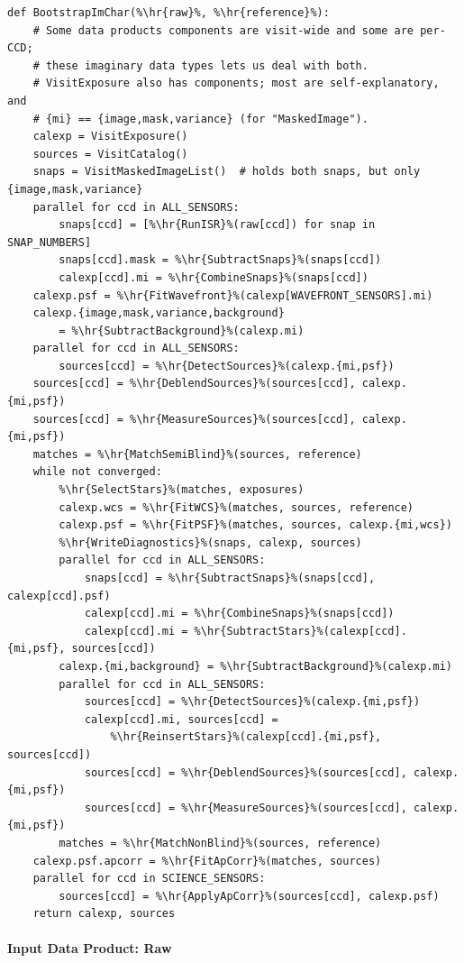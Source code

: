 \begin{lstlisting}
def BootstrapImChar(%\hr{raw}%, %\hr{reference}%):
    # Some data products components are visit-wide and some are per-CCD;
    # these imaginary data types lets us deal with both.
    # VisitExposure also has components; most are self-explanatory, and
    # {mi} == {image,mask,variance} (for "MaskedImage").
    calexp = VisitExposure()
    sources = VisitCatalog()
    snaps = VisitMaskedImageList()  # holds both snaps, but only {image,mask,variance}
    parallel for ccd in ALL_SENSORS:
        snaps[ccd] = [%\hr{RunISR}%(raw[ccd]) for snap in SNAP_NUMBERS]
        snaps[ccd].mask = %\hr{SubtractSnaps}%(snaps[ccd])
        calexp[ccd].mi = %\hr{CombineSnaps}%(snaps[ccd])
    calexp.psf = %\hr{FitWavefront}%(calexp[WAVEFRONT_SENSORS].mi)
    calexp.{image,mask,variance,background}
        = %\hr{SubtractBackground}%(calexp.mi)
    parallel for ccd in ALL_SENSORS:
        sources[ccd] = %\hr{DetectSources}%(calexp.{mi,psf})
    sources[ccd] = %\hr{DeblendSources}%(sources[ccd], calexp.{mi,psf})
    sources[ccd] = %\hr{MeasureSources}%(sources[ccd], calexp.{mi,psf})
    matches = %\hr{MatchSemiBlind}%(sources, reference)
    while not converged:
        %\hr{SelectStars}%(matches, exposures)
        calexp.wcs = %\hr{FitWCS}%(matches, sources, reference)
        calexp.psf = %\hr{FitPSF}%(matches, sources, calexp.{mi,wcs})
        %\hr{WriteDiagnostics}%(snaps, calexp, sources)
        parallel for ccd in ALL_SENSORS:
            snaps[ccd] = %\hr{SubtractSnaps}%(snaps[ccd], calexp[ccd].psf)
            calexp[ccd].mi = %\hr{CombineSnaps}%(snaps[ccd])
            calexp[ccd].mi = %\hr{SubtractStars}%(calexp[ccd].{mi,psf}, sources[ccd])
        calexp.{mi,background} = %\hr{SubtractBackground}%(calexp.mi)
        parallel for ccd in ALL_SENSORS:
            sources[ccd] = %\hr{DetectSources}%(calexp.{mi,psf})
            calexp[ccd].mi, sources[ccd] =
                %\hr{ReinsertStars}%(calexp[ccd].{mi,psf}, sources[ccd])
            sources[ccd] = %\hr{DeblendSources}%(sources[ccd], calexp.{mi,psf})
            sources[ccd] = %\hr{MeasureSources}%(sources[ccd], calexp.{mi,psf})
        matches = %\hr{MatchNonBlind}%(sources, reference)
    calexp.psf.apcorr = %\hr{FitApCorr}%(matches, sources)
    parallel for ccd in SCIENCE_SENSORS:
        sources[ccd] = %\hr{ApplyApCorr}%(sources[ccd], calexp.psf)
    return calexp, sources
\end{lstlisting}

\paragraph{Input Data Product: Raw}
\label{sec:drpBootstrapImChar_raw}

